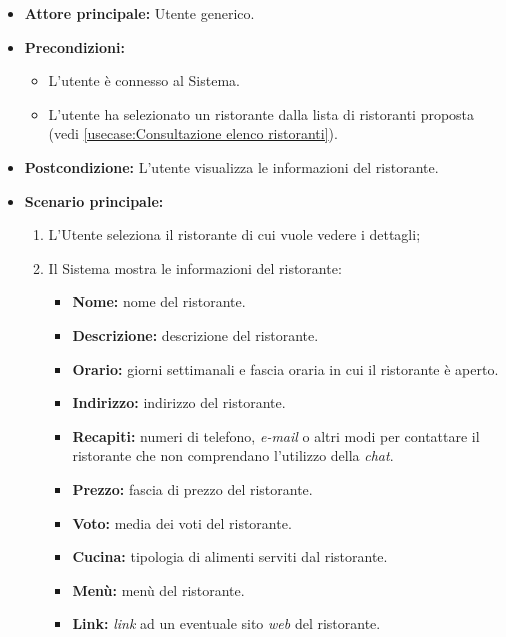 \label{usecase:Visualizzazione di un ristorante}
\begin{itemize}
	\item \textbf{Attore principale:} Utente generico.


	\item \textbf{Precondizioni:}
	\begin{itemize}
        \item L'utente è connesso al Sistema.
        \item L'utente ha selezionato un ristorante dalla lista di ristoranti proposta (vedi \autoref{usecase:Consultazione elenco ristoranti}).
    \end{itemize}

	\item \textbf{Postcondizione:} L'utente visualizza le informazioni del ristorante.

	\item \textbf{Scenario principale:}
		\begin{enumerate}
		    \item L'Utente seleziona il ristorante di cui vuole vedere i dettagli;
		    \item Il Sistema mostra le informazioni del ristorante:
		    \begin{itemize}
				\item \textbf{Nome:} nome del ristorante.
				\item \textbf{Descrizione:} descrizione del ristorante.
				\item \textbf{Orario:} giorni settimanali e fascia oraria in cui il ristorante è aperto.
				\item \textbf{Indirizzo:} indirizzo del ristorante.
				\item \textbf{Recapiti:} numeri di telefono, \textit{e-mail} o altri modi per contattare il ristorante che non comprendano l'utilizzo della \textit{chat}.
				\item \textbf{Prezzo:} fascia di prezzo del ristorante.
				\item \textbf{Voto:} media dei voti del ristorante.
				\item \textbf{Cucina:} tipologia di alimenti serviti dal ristorante.
				\item \textbf{Menù:} menù del ristorante.
				\item \textbf{Link:} \textit{link} ad un eventuale sito \textit{web} del ristorante. 
			\end{itemize}
	    \end{enumerate}

\end{itemize}
